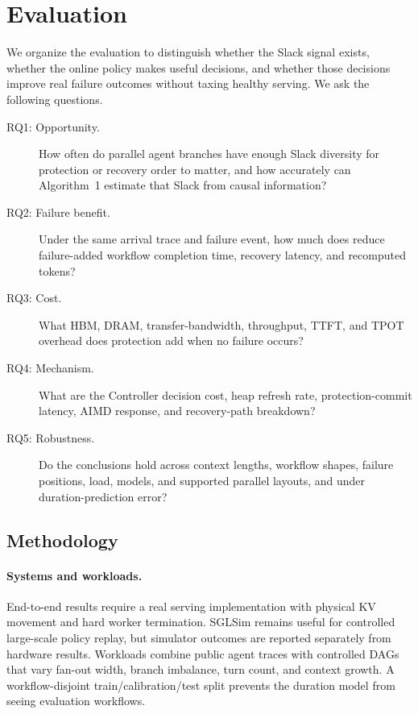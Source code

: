 \section{Evaluation}
\label{sec:evaluation}

We organize the evaluation to distinguish whether the Slack signal exists,
whether the online policy makes useful decisions, and whether those decisions
improve real failure outcomes without taxing healthy serving.  We ask the
following questions.

\begin{description}
  \item[RQ1: Opportunity.] How often do parallel agent branches have enough
  Slack diversity for protection or recovery order to matter, and how
  accurately can Algorithm~1 estimate that Slack from causal information?

  \item[RQ2: Failure benefit.] Under the same arrival trace and failure event,
  how much does \system{} reduce failure-added workflow completion time,
  recovery latency, and recomputed tokens?

  \item[RQ3: Cost.] What HBM, DRAM, transfer-bandwidth, throughput,
  TTFT, and TPOT overhead does protection add when no failure occurs?

  \item[RQ4: Mechanism.] What are the Controller decision cost, heap refresh
  rate, protection-commit latency, AIMD response, and recovery-path breakdown?

  \item[RQ5: Robustness.] Do the conclusions hold across context lengths,
  workflow shapes, failure positions, load, models, and supported parallel
  layouts, and under duration-prediction error?
\end{description}

\subsection{Methodology}

\paragraph{Systems and workloads.}
End-to-end results require a real serving implementation with physical KV
movement and hard worker termination.  SGLSim remains useful for controlled
large-scale policy replay, but simulator outcomes are reported separately from
hardware results.  Workloads combine public agent traces with controlled DAGs
that vary fan-out width, branch imbalance, turn count, and context growth.  A
workflow-disjoint train/calibration/test split prevents the duration model from
seeing evaluation workflows.

